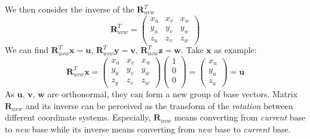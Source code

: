 \documentclass[10pt, a4paper]{article}
\begin{document}
                \indent We then consider the inverse of the $\textbf{R}_{uvw}^T$ 
                \begin{equation*}
                    \textbf{R}_{uvw}^T = 
                    \begin{pmatrix}
                        x_u & x_v & x_w\\
                        y_u & y_v & y_w\\
                        z_u & z_v & z_w
                    \end{pmatrix}
                \end{equation*}
                \newpage
                \indent We can find $\textbf{R}_{uvw}^T\textbf{x}=\textbf{u}$, $\textbf{R}_{uvw}^T\textbf{y}=\textbf{v}$, $\textbf{R}_{uvw}^T\textbf{z}=\textbf{w}$. Take $\textbf{x}$ as example:
                \begin{equation*}
                    \textbf{R}_{uvw}^T\textbf{x}=
                    \begin{pmatrix}
                        x_u & x_v & x_w\\
                        y_u & y_v & y_w\\
                        z_y & z_v & z_w
                    \end{pmatrix}
                    \begin{pmatrix}
                        1\\
                        0\\
                        0\\
                    \end{pmatrix}
                    =
                    \begin{pmatrix}
                        x_u\\
                        y_u\\
                        z_u
                    \end{pmatrix}
                    =\textbf{u}
                \end{equation*}
            \indent As $\textbf{u}$, $\textbf{v}$, $\textbf{w}$ are orthonormal, they can form a new group of base vectors. Matrix $\textbf{R}_{uvw}$ and its inverse can be perceived as the transform of the \emph{rotation} between different coordinate systems. Especially, $\textbf{R}_{uvw}$ means converting from \emph{current} base to \emph{new} base while its inverse means converting from \emph{new} base to \emph{current} base.\\
\end{document}
